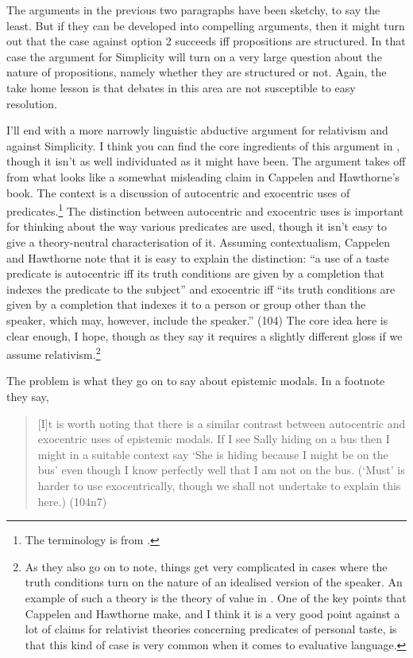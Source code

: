 The arguments in the previous two paragraphs have been sketchy, to say the least. But if they can be developed into compelling arguments, then it might turn out that the case against option 2 succeeds iff propositions are structured. In that case the argument for Simplicity will turn on a very large question about the nature of propositions, namely whether they are structured or not. Again, the take home lesson is that debates in this area are not susceptible to easy resolution.

I'll end with a more narrowly linguistic abductive argument for relativism and against Simplicity. I think you can find the core ingredients of this argument in \citet{Egan2005-EGAEMI}, though it isn't as well individuated as it might have been. The argument takes off from what looks like a somewhat misleading claim in Cappelen and Hawthorne's book. The context is a discussion of autocentric and exocentric uses of predicates.\footnote{The terminology is from \citet{Lasersohn2005}.} The distinction between autocentric and exocentric uses is important for thinking about the way various predicates are used, though it isn't easy to give a theory-neutral characterisation of it. Assuming contextualism, Cappelen and Hawthorne note that it is easy to explain the distinction: ``a use of a taste predicate is autocentric iff its truth conditions are given by a completion that indexes the predicate to the subject'' and exocentric iff ``its truth conditions are given by a completion that indexes it to a person or group other than the speaker, which may, however, include the speaker.'' (104) The core idea here is clear enough, I hope, though as they say it requires a slightly different gloss if we assume relativism.\footnote{As they also go on to note, things get very complicated in cases where the truth conditions turn on the nature of an idealised version of the speaker. An example of such a theory is the theory of value in \citet{Lewis1989b}. One of the key points that Cappelen and Hawthorne make, and I think it is a very good point against a lot of claims for relativist theories concerning predicates of personal taste, is that this kind of case is very common when it comes to evaluative language.}

The problem is what they go on to say about epistemic modals. In a footnote they say,

\begin{quote}[I]t is worth noting that there is a similar contrast between autocentric and exocentric uses of epistemic modals. If I see Sally hiding on a bus then I might in a suitable context say `She is hiding because I might be on the bus' even though I know perfectly well that I am not on the bus. (`Must' is harder to use exocentrically, though we shall not undertake to explain this here.) (104n7)\end{quote}

